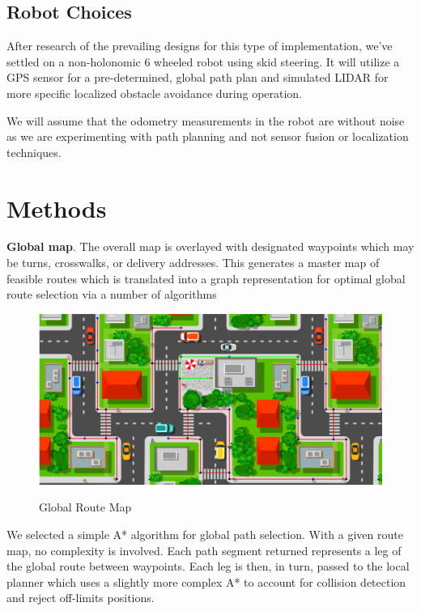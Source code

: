 \documentclass{article}
\begin{document}
\begin{multicols}{2}
\subsection*{Robot Choices}
After research of the prevailing designs for this type of implementation, we've settled on a non-holonomic 6 wheeled robot using skid steering. It will utilize a GPS sensor for a pre-determined, global path plan and simulated LIDAR for more specific localized obstacle avoidance during operation. 

 We will assume that the odometry measurements in the robot are without noise as we are experimenting with path planning and not sensor fusion or localization techniques.

\section*{Methods}
\noindent \textbf{Global map}.  The overall map is overlayed with designated waypoints which may be turns, crosswalks, or delivery addresses.  This generates a master map of feasible routes which is translated into a graph representation for optimal global route selection via a number of algorithms\\
\begin{figure}[H]
   \centering
    \includegraphics[width = 1\columnwidth]{figures/routemap.png}
     \label{fig:routemap}
     \caption{Global Route Map}
\end{figure}
\noindent We selected a simple A* algorithm for global path selection.  With a given route map, no complexity is involved.  Each path segment returned represents a leg of the global route between waypoints.  Each leg is then, in turn, passed to the local planner which uses a slightly more complex A* to account for collision detection and reject off-limits positions.
\begin{figure}[H]
   \centering

\end{figure}
\end{multicols}
\end{document}
